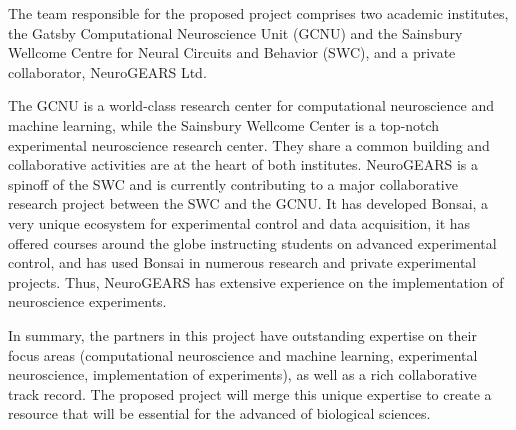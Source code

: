 The team responsible for the proposed project comprises two academic
institutes, the Gatsby Computational Neuroscience Unit (GCNU) and the Sainsbury
Wellcome Centre for Neural Circuits and Behavior (SWC), and a private
collaborator, NeuroGEARS Ltd.

The GCNU is a world-class research center for computational neuroscience and
machine learning, while the Sainsbury Wellcome Center is a top-notch experimental
neuroscience research center. They share a common building and collaborative
activities are at the heart of both institutes.
%
NeuroGEARS is a spinoff of the SWC and is currently contributing to a major
collaborative research project between the SWC and the GCNU. It has developed
Bonsai, a very unique ecosystem for experimental control and data acquisition,
it has offered courses around the globe instructing students on advanced
experimental control, and has used Bonsai in numerous research and private
experimental projects. Thus, NeuroGEARS has extensive experience on the
implementation of neuroscience experiments.

In summary, the partners in this project have outstanding expertise on their
focus areas (computational neuroscience and machine learning, experimental
neuroscience, implementation of experiments), as well as a rich collaborative
track record. The proposed project will merge this unique expertise to create a
resource that will be essential for the advanced of biological sciences.
